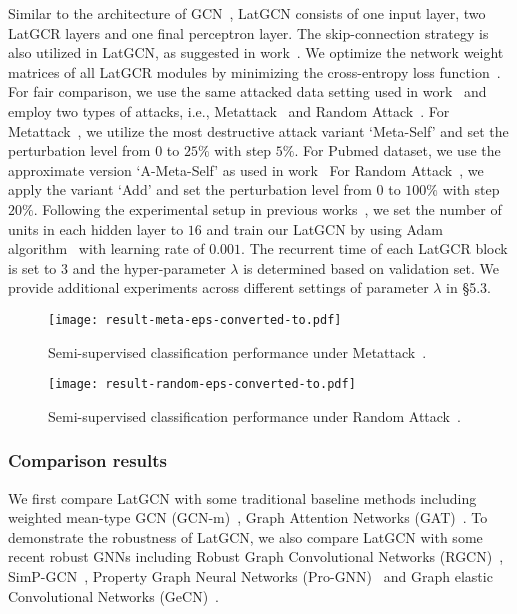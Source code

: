 \documentclass{article}
\begin{document}
Similar to the architecture of GCN~\cite{kipf2016semi}, LatGCN consists of one input layer, two LatGCR layers and one final  perceptron layer. The skip-connection strategy is also utilized in LatGCN, as suggested in work~\cite{kipf2016semi,7780459}.
We optimize the network weight matrices of all LatGCR modules by minimizing the cross-entropy loss function~\cite{kipf2016semi}.
For fair comparison,
we use the same attacked data setting used in work~\cite{prognn} and employ two types of attacks, i.e., Metattack~\cite{mettack} and Random Attack~\cite{jin2020adversarial}.
For Metattack~\cite{mettack},  we utilize the most destructive attack variant `Meta-Self' and
set the perturbation level from $0$ to $25\%$ with step $5\%$.
For Pubmed dataset, we use the approximate version `A-Meta-Self'  as used in work~\cite{prognn}
For Random Attack~\cite{jin2020adversarial},  we apply the variant `Add' and
set the perturbation level from $0$ to $100\%$ with step $20\%$.
Following the experimental setup in previous works~\cite{kipf2016semi,velickovic2017graph},
we set the number of units in each hidden layer to $16$
and train our LatGCN by using Adam algorithm~\cite{Adam} with learning rate of $0.001$.
The recurrent time of each LatGCR block is set to $3$ and the hyper-parameter $\lambda$ is determined based on validation set.
We provide additional experiments across different settings of parameter $\lambda$ in \S 5.3.
\begin{figure*}[ht]
\centering
\texttt{[image: result-meta-eps-converted-to.pdf]}
  \caption{Semi-supervised classification performance under Metattack~\cite{mettack}.}
\label{fig:result-semi-noise-meta}
\end{figure*}
\begin{figure*}[ht]
\centering
\texttt{[image: result-random-eps-converted-to.pdf]}
  \caption{Semi-supervised  classification performance under Random Attack~\cite{jin2020adversarial}.}
\label{fig:result-semi-noise-random}
\end{figure*}
\subsubsection{Comparison results}


We first compare LatGCN with some traditional baseline methods including weighted mean-type GCN (GCN-m)~\cite{kipf2016semi,graphsage}, Graph Attention Networks (GAT)~\cite{velickovic2017graph}.
To demonstrate the robustness of LatGCN,
we also compare LatGCN with some recent robust GNNs including Robust Graph Convolutional Networks (RGCN)~\cite{RGCN}, SimP-GCN~\cite{SimPGCN}, Property Graph Neural Networks (Pro-GNN)~\cite{prognn} and Graph elastic Convolutional Networks (GeCN)~\cite{GECN}.
\end{document}

